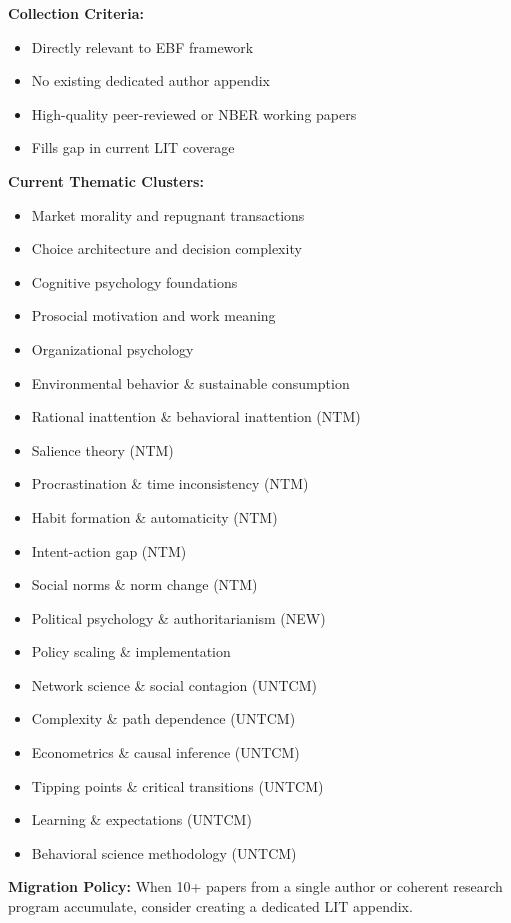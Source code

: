\begin{tcolorbox}[colback=gray!5!white,colframe=gray!75!black,title=Quick Reference]
\textbf{Collection Criteria:}
\begin{itemize}
    \item Directly relevant to EBF framework
    \item No existing dedicated author appendix
    \item High-quality peer-reviewed or NBER working papers
    \item Fills gap in current LIT coverage
\end{itemize}

\textbf{Current Thematic Clusters:}
\begin{itemize}
    \item Market morality and repugnant transactions
    \item Choice architecture and decision complexity
    \item Cognitive psychology foundations
    \item Prosocial motivation and work meaning
    \item Organizational psychology
    \item Environmental behavior \& sustainable consumption
    \item Rational inattention \& behavioral inattention (NTM)
    \item Salience theory (NTM)
    \item Procrastination \& time inconsistency (NTM)
    \item Habit formation \& automaticity (NTM)
    \item Intent-action gap (NTM)
    \item Social norms \& norm change (NTM)
    \item Political psychology \& authoritarianism (NEW)
    \item Policy scaling \& implementation
    \item Network science \& social contagion (UNTCM)
    \item Complexity \& path dependence (UNTCM)
    \item Econometrics \& causal inference (UNTCM)
    \item Tipping points \& critical transitions (UNTCM)
    \item Learning \& expectations (UNTCM)
    \item Behavioral science methodology (UNTCM)
\end{itemize}

\textbf{Migration Policy:} When 10+ papers from a single author or coherent research program accumulate, consider creating a dedicated LIT appendix.
\end{tcolorbox}


